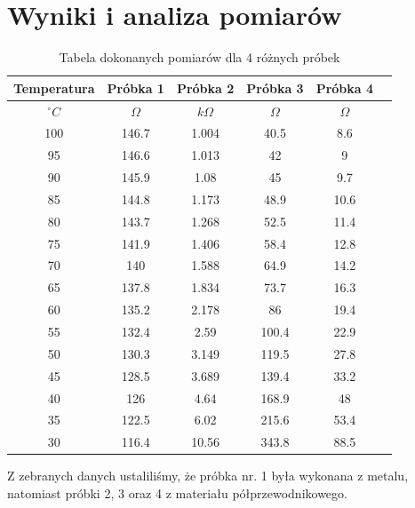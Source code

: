 \section{Wyniki i analiza pomiarów}


\begin{table}[!ht]
    \centering
    \begin{tabular}{|c|c|c|c|c|c|}
    \hline
    Temperatura & Próbka 1 & Próbka 2 & Próbka 3 & Próbka 4 \\ \hline
    $^{\circ}C$ & $\Omega$ & $k\Omega$ & $\Omega$ & $\Omega$ \\ \hline\hline
    100         & 146.7    & 1.004     & 40.5     & 8.6  \\ \hline
    95          & 146.6    & 1.013     & 42       & 9    \\ \hline
    90          & 145.9    & 1.08      & 45       & 9.7  \\ \hline
    85          & 144.8    & 1.173     & 48.9     & 10.6 \\ \hline
    80          & 143.7    & 1.268     & 52.5     & 11.4 \\ \hline
    75          & 141.9    & 1.406     & 58.4     & 12.8 \\ \hline
    70          & 140      & 1.588     & 64.9     & 14.2 \\ \hline
    65          & 137.8    & 1.834     & 73.7     & 16.3 \\ \hline
    60          & 135.2    & 2.178     & 86       & 19.4 \\ \hline
    55          & 132.4    & 2.59      & 100.4    & 22.9 \\ \hline
    50          & 130.3    & 3.149     & 119.5    & 27.8 \\ \hline
    45          & 128.5    & 3.689     & 139.4    & 33.2 \\ \hline
    40          & 126      & 4.64      & 168.9    & 48   \\ \hline
    35          & 122.5    & 6.02      & 215.6    & 53.4 \\ \hline
    30          & 116.4    & 10.56     & 343.8    & 88.5 \\ \hline
    \end{tabular}
    \caption{Tabela dokonanych pomiarów dla 4 różnych próbek}
    \label{tab:my_label}
\end{table}

Z zebranych danych ustaliliśmy, że próbka nr. 1 była wykonana z metalu, natomiast próbki 2, 3 oraz 4 z materiału półprzewodnikowego.

